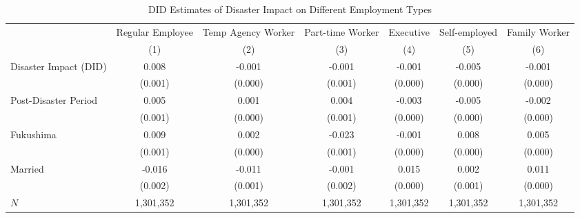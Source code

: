 \documentclass[serif, aspectratio=169]{beamer}
\begin{document}
\begin{frame}


\begin{table}[htbp]
\centering
\caption{DID Estimates of Disaster Impact on Different Employment Types}


\begin{tabular}{@{}l*{6}{c}@{}}
          &\multicolumn{1}{c}{Regular Employee}&\multicolumn{1}{c}{Temp Agency Worker}&\multicolumn{1}{c}{Part-time Worker}&\multicolumn{1}{c}{Executive}&\multicolumn{1}{c}{Self-employed}&\multicolumn{1}{c}{Family Worker}\\\cmidrule(lr){2-2}\cmidrule(lr){3-3}\cmidrule(lr){4-4}\cmidrule(lr){5-5}\cmidrule(lr){6-6}\cmidrule(lr){7-7}
          &\multicolumn{1}{c}{(1)}         &\multicolumn{1}{c}{(2)}         &\multicolumn{1}{c}{(3)}         &\multicolumn{1}{c}{(4)}         &\multicolumn{1}{c}{(5)}         &\multicolumn{1}{c}{(6)}         \\
\toprule
Disaster Impact (DID)&    0.008\sym{***}&   -0.001\sym{***}&   -0.001         &   -0.001\sym{**} &   -0.005\sym{***}&   -0.001\sym{***}\\
          &  (0.001)         &  (0.000)         &  (0.001)         &  (0.000)         &  (0.000)         &  (0.000)         \\
\addlinespace
Post-Disaster Period&    0.005\sym{***}&    0.001\sym{***}&    0.004\sym{***}&   -0.003\sym{***}&   -0.005\sym{***}&   -0.002\sym{***}\\
          &  (0.001)         &  (0.000)         &  (0.001)         &  (0.000)         &  (0.000)         &  (0.000)         \\
\addlinespace
Fukushima &    0.009\sym{***}&    0.002\sym{***}&   -0.023\sym{***}&   -0.001\sym{***}&    0.008\sym{***}&    0.005\sym{***}\\
          &  (0.001)         &  (0.000)         &  (0.001)         &  (0.000)         &  (0.000)         &  (0.000)         \\
\addlinespace
Married   &   -0.016\sym{***}&   -0.011\sym{***}&   -0.001         &    0.015\sym{***}&    0.002\sym{***}&    0.011\sym{***}\\
          &  (0.002)         &  (0.001)         &  (0.002)         &  (0.000)         &  (0.001)         &  (0.000)         \\
\midrule
$\textit{N}$&1,301,352         &1,301,352         &1,301,352         &1,301,352         &1,301,352         &1,301,352         \\

\end{tabular}
\end{table}
\end{frame}
\end{document}
